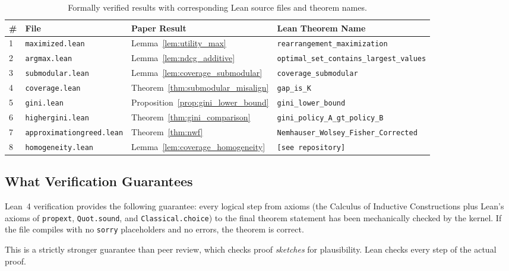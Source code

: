 \documentclass[11pt,a4paper]{article}
\theoremstyle{definition}
\theoremstyle{plain}
\theoremstyle{remark}
\begin{document}
\begin{table}[h]
\centering
\small
\begin{tabular}{@{}lllp{5.5cm}@{}}
\toprule
\textbf{\#} & \textbf{File} & \textbf{Paper Result} & \textbf{Lean Theorem Name} \\
\midrule
1 & \texttt{maximized.lean} & Lemma~\ref{lem:utility_max} & \texttt{rearrangement\_maximization} \\
2 & \texttt{argmax.lean} & Lemma~\ref{lem:ndcg_additive} & \texttt{optimal\_set\_contains\_largest\_values} \\
3 & \texttt{submodular.lean} & Lemma~\ref{lem:coverage_submodular} & \texttt{coverage\_submodular} \\
4 & \texttt{coverage.lean} & Theorem~\ref{thm:submodular_misalign} & \texttt{gap\_is\_K} \\
5 & \texttt{gini.lean} & Proposition~\ref{prop:gini_lower_bound} & \texttt{gini\_lower\_bound} \\
6 & \texttt{highergini.lean} & Theorem~\ref{thm:gini_comparison} & \texttt{gini\_policy\_A\_gt\_policy\_B} \\
7 & \texttt{approximationgreed.lean} & Theorem~\ref{thm:nwf} & \texttt{Nemhauser\_Wolsey\_Fisher\_Corrected} \\
8 & \texttt{homogeneity.lean} & Lemma~\ref{lem:coverage_homogeneity} & \texttt{[see repository]} \\
\bottomrule
\end{tabular}
\caption{Formally verified results with corresponding Lean source files and theorem names.}
\label{tab:lean_proofs}
\end{table}

\subsection{What Verification Guarantees}
\label{app:verification_guarantees}

Lean~4 verification provides the following guarantee: every logical step from axioms (the Calculus of Inductive Constructions plus Lean's axioms of \texttt{propext}, \texttt{Quot.sound}, and \texttt{Classical.choice}) to the final theorem statement has been mechanically checked by the kernel. If the file compiles with no \texttt{sorry} placeholders and no errors, the theorem is correct.

This is a strictly stronger guarantee than peer review, which checks proof \textit{sketches} for plausibility. Lean checks every step of the actual proof.
\end{document}
